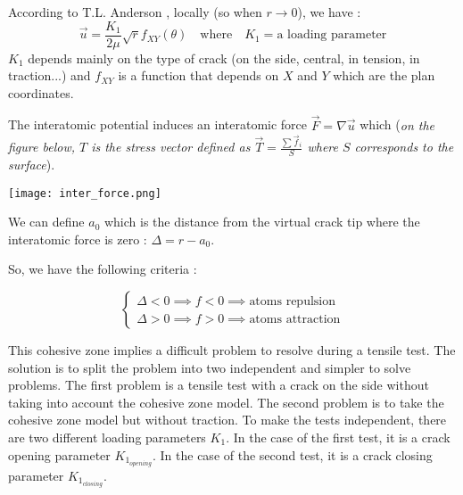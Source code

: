             According to T.L. Anderson \cite{2}, locally (so when $r\rightarrow 0$), we have :
            $$
            \vec{u} = \frac{K_1}{2\mu}\sqrt{r}f_{XY}(\theta) \quad\text{where}\quad K_1 = \text{a loading parameter}
            $$
            $K_1$ depends mainly on the type of crack (on the side, central, in tension, in traction...) and $f_{XY}$ is a function that depends on $X$ and $Y$ which are the plan coordinates.\medskip

            The interatomic potential induces an interatomic force $\vec{F} = \nabla \vec{u}$ which (\textit{on the figure below, $T$ is the stress vector defined as $\vec{T} = \frac{\sum\vec{f}_i}{S}$ where $S$ corresponds to the surface}). 

            \begin{center}
                \captionsetup{type=figure}
                \texttt{[image: inter\_force.png]}
            \end{center}
            
            We can define $a_0$ which is the distance from the virtual crack tip where the interatomic force is zero : $\Delta = r - a_0$. 
            
            So, we have the following criteria : 

            $$
            \left\lbrace\begin{array}{l}
                \Delta < 0 \implies f < 0 \implies \text{atoms repulsion}\\
                \Delta > 0 \implies f > 0 \implies \text{atoms attraction}
            \end{array}\right.
            $$
            \medskip

            This \gls{cohesive zone} implies a difficult problem to resolve during a tensile test. The solution is to split the problem into two independent and simpler to solve problems. The first problem is a tensile test with a crack on the side without taking into account the \gls{cohesive zone} model. The second problem is to take the \gls{cohesive zone} model but without traction. To make the tests independent, there are two different loading parameters $K_1$. In the case of the first test, it is a crack opening parameter $K_{1_{opening}}$. In the case of the second test, it is a crack closing parameter $K_{1_{closing}}$.

